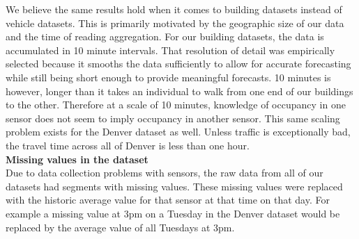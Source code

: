 We believe the same results hold when it comes to building datasets instead of vehicle datasets.  This is primarily motivated by the geographic size of our data and the time of reading aggregation.  For our building datasets, the data is accumulated in 10 minute intervals.  That resolution of detail was empirically selected because it smooths the data sufficiently to allow for accurate forecasting while still being short enough to provide meaningful forecasts.  10 minutes is however, longer than it takes an individual to walk from one end of our buildings to the other.  Therefore at a scale of 10 minutes, knowledge of occupancy in one sensor does not seem to imply occupancy in another sensor.  This same scaling problem exists for the Denver dataset as well.  Unless traffic is exceptionally bad, the travel time across all of Denver is less than one hour.\\

\noindent
\textbf{Missing values in the dataset} \\
Due to data collection problems with sensors, the raw data from all of our datasets had segments with missing values.  These missing values were replaced with the historic average value for that sensor at that time on that day.  For example a missing value at 3pm on a Tuesday in the Denver dataset would be replaced by the average value of all Tuesdays at 3pm.
